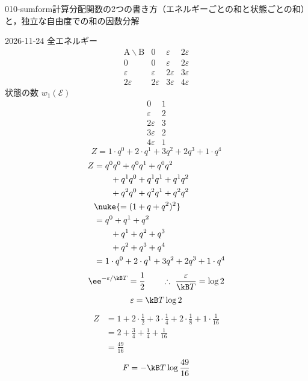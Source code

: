 \documentclass[uplatex,dvipdfmx,a4paper,11pt]{jsarticle}
\begin{document}
\begin{mondai}{010-sumform}{計算}{分配関数の2つの書き方（エネルギーごとの和と状態ごとの和）と，独立な自由度での和の因数分解}
\begin{kotaeutsushi}{2026-11-24}
全エネルギー
\[
\begin{array}{c|ccc}
\mathrm{A}\backslash\mathrm{B} & 0 & \varepsilon & 2\varepsilon\\ \hline
0 & 0 & \varepsilon & 2\varepsilon\\
\varepsilon & \varepsilon & 2\varepsilon & 3\varepsilon\\
2\varepsilon & 2\varepsilon & 3\varepsilon & 4\varepsilon
\end{array}
\]
状態の数 $w_{1}(\mathcal{E})$
\[
\begin{array}{c|c}
0 & 1\\ \hline
\varepsilon & 2\\ \hline
2\varepsilon & 3\\ \hline
3\varepsilon & 2\\ \hline
4\varepsilon & 1
\end{array}
\]
\[ Z=1\cdot q^{0}+2\cdot q^{1}+3q^{2}+2q^{3}+1\cdot q^{4} \]
\begin{align*}
Z&=q^{0}q^{0}+q^{0}q^{1}+q^{0}q^{2}\\
&\qquad+q^{1}q^{0}+q^{1}q^{1}+q^{1}q^{2}\\
&\qquad+q^{2}q^{0}+q^{2}q^{1}+q^{2}q^{2}\\
&\nuke{=(1+q+q^{2})^{2}}\\
&=q^{0}+q^{1}+q^{2}\\
&\qquad+q^{1}+q^{2}+q^{3}\\
&\qquad+q^{2}+q^{3}+q^{4}\\
&=1\cdot q^{0}+2\cdot q^{1}+3q^{2}+2q^{3}+1\cdot q^{4}
\end{align*}
\[ \ee^{-\varepsilon/\kB T}=\frac{1}{2}\qquad\therefore\ \frac{\varepsilon}{\kB T}=\log2 \]
\[ \varepsilon=\kB T\log2 \]
\begin{align*}
Z&=1+2\cdot\frac{1}{2}+3\cdot\frac{1}{4}+2\cdot\frac{1}{8}+1\cdot\frac{1}{16}\\
&=2+\frac{3}{4}+\frac{1}{4}+\frac{1}{16}\\
&=\frac{49}{16}
\end{align*}
\begin{align*}
F&=-\kB T\log\frac{49}{16}\\

\end{align*}
\end{kotaeutsushi}
\end{mondai}
\end{document}
